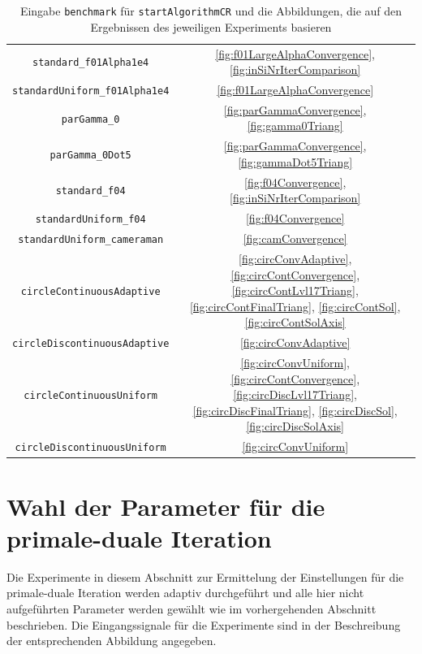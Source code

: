 \begin{table}[p]
\begin{tabular}{c|c}
    \texttt{standard\_f01Alpha1e4} &
    \ref{fig:f01LargeAlphaConvergence}, \ref{fig:inSiNrIterComparison}\\
    \texttt{standardUniform\_f01Alpha1e4} &
    \ref{fig:f01LargeAlphaConvergence}\\
    \texttt{parGamma\_0} &
    \ref{fig:parGammaConvergence}, \ref{fig:gamma0Triang}\\
    \texttt{parGamma\_0Dot5} &
    \ref{fig:parGammaConvergence}, \ref{fig:gammaDot5Triang}\\
    \texttt{standard\_f04} &
    \ref{fig:f04Convergence}, \ref{fig:inSiNrIterComparison}\\
    \texttt{standardUniform\_f04} &
    \ref{fig:f04Convergence}\\
    \texttt{standardUniform\_cameraman} &
    \ref{fig:camConvergence}\\
    \texttt{circleContinuousAdaptive} &
    \ref{fig:circConvAdaptive}, \ref{fig:circContConvergence},
    \ref{fig:circContLvl17Triang}, \ref{fig:circContFinalTriang},
    \ref{fig:circContSol}, \ref{fig:circContSolAxis}\\
    \texttt{circleDiscontinuousAdaptive} &
    \ref{fig:circConvAdaptive}\\
    \texttt{circleContinuousUniform} &
    \ref{fig:circConvUniform}, \ref{fig:circContConvergence},
    \ref{fig:circDiscLvl17Triang}, \ref{fig:circDiscFinalTriang},
    \ref{fig:circDiscSol}, \ref{fig:circDiscSolAxis}\\
    \texttt{circleDiscontinuousUniform} &
    \ref{fig:circConvUniform}\\
    \hline
  \end{tabular}
  \caption{Eingabe \texttt{benchmark} für \texttt{startAlgorithmCR} und die
  Abbildungen, die auf den Ergebnissen des jeweiligen Experiments basieren}
  \label{tab:usedBenchmarks}
\end{table} 


\section{Wahl der Parameter für die primale-duale Iteration}
\label{sec:choiceOfParameters}

Die Experimente in diesem Abschnitt zur Ermittelung der Einstellungen
für die primale-duale Iteration werden adaptiv durchgeführt und alle hier
nicht aufgeführten Parameter werden gewählt wie im vorhergehenden Abschnitt
beschrieben.
Die Eingangssignale für die Experimente sind in der Beschreibung der 
entsprechenden Abbildung angegeben.


